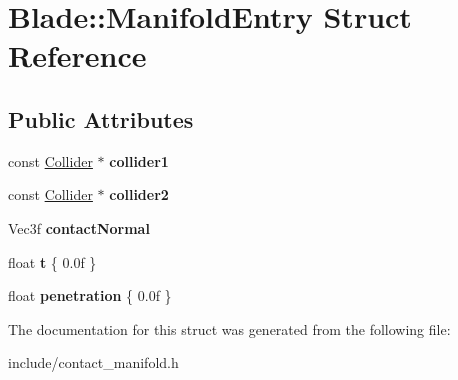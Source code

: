 \hypertarget{struct_blade_1_1_manifold_entry}{}\section{Blade\+:\+:Manifold\+Entry Struct Reference}
\label{struct_blade_1_1_manifold_entry}
\subsection*{Public Attributes}
\begin{DoxyCompactItemize}
\item 
\mbox{\label{struct_blade_1_1_manifold_entry_ac9aa5bc7b2bb1528dacf55a920f7c606}} 
const \hyperlink{class_blade_1_1_collider}{Collider} $\ast$ {\bfseries collider1}
\item 
\mbox{\label{struct_blade_1_1_manifold_entry_aba9ecec3a9f591842930c075c9befb27}} 
const \hyperlink{class_blade_1_1_collider}{Collider} $\ast$ {\bfseries collider2}
\item 
\mbox{\label{struct_blade_1_1_manifold_entry_a20f40d061764f24ac354cb0ab9f4cb48}} 
Vec3f {\bfseries contact\+Normal}
\item 
\mbox{\label{struct_blade_1_1_manifold_entry_a88442021e9262b9620528241df4fa0aa}} 
float {\bfseries t} \{ 0.\+0f \}
\item 
\mbox{\label{struct_blade_1_1_manifold_entry_a70040f92b771488762cc5e3e49c9cbf4}} 
float {\bfseries penetration} \{ 0.\+0f \}
\end{DoxyCompactItemize}


The documentation for this struct was generated from the following file\+:\begin{DoxyCompactItemize}
\item 
include/contact\+\_\+manifold.\+h\end{DoxyCompactItemize}
